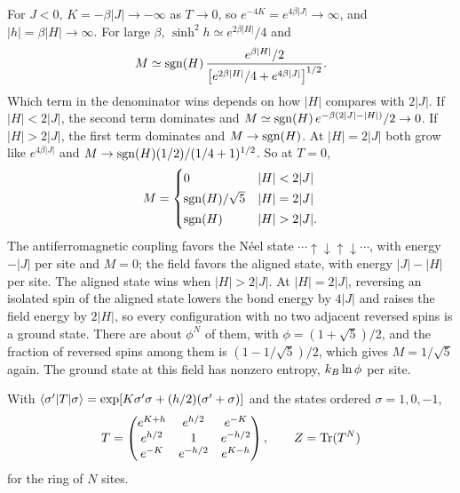 For $J<0$, $K = -\beta|J|\to-\infty$ as $T\to 0$, so $e^{-4K} = e^{4\beta|J|}\to\infty$, and $|h| = \beta|H|\to\infty$.
For large $\beta$, $\sinh^2h\simeq e^{2\beta|H|}/4$ and
\begin{equation}
  M\simeq\operatorname{sgn}(H)\,\frac{e^{\beta|H|}/2}{\left[e^{2\beta|H|}/4+e^{4\beta|J|}\right]^{1/2}}.
\end{equation}
Which term in the denominator wins depends on how $|H|$ compares with $2|J|$. If $|H|<2|J|$, the second term
dominates and $M\simeq\operatorname{sgn}(H)\,e^{-\beta(2|J|-|H|)}/2\to 0$. If $|H|>2|J|$, the first term dominates and
$M\to\operatorname{sgn}(H)$. At $|H| = 2|J|$ both grow like $e^{4\beta|J|}$ and $M\to\operatorname{sgn}(H)(1/2)/(1/4+1)^{1/2}$. So at $T = 0$,
\begin{equation}
  M = \begin{cases} 0 & |H|<2|J|\\[2pt] \sgn(H)/\sqrt5 & |H| = 2|J|\\[2pt] \sgn(H) & |H|>2|J| .\end{cases}
\end{equation}
The antiferromagnetic coupling favors the N\'eel state $\cdots\uparrow\downarrow\uparrow\downarrow\cdots$, with energy
$-|J|$ per site and $M = 0$; the field favors the aligned state, with energy $|J|-|H|$ per site. The aligned state wins
when $|H|>2|J|$. At $|H| = 2|J|$, reversing an isolated spin of the aligned state lowers the bond energy by $4|J|$ and
raises the field energy by $2|H|$, so every configuration with no two adjacent reversed spins is a ground state. There
are about $\phi^N$ of them, with $\phi = (1+\sqrt5)/2$, and the fraction of reversed spins among them is
$(1-1/\sqrt5)/2$, which gives $M = 1/\sqrt5$ again. The ground state at this field has nonzero entropy, $k_{B}\ln\phi$
per site.

 With $\langle \sigma'|T|\sigma\rangle = \exp[K\sigma'\sigma+(h/2)(\sigma'+\sigma)]$ and the states ordered
$\sigma = 1,0,-1$,
\begin{equation}
  T = \begin{pmatrix} e^{K+h} & e^{h/2} & e^{-K}\\ e^{h/2} & 1 & e^{-h/2}\\ e^{-K} & e^{-h/2} & e^{K-h}\end{pmatrix},
  \qquad Z = \operatorname{Tr}(T^N)
\end{equation}
for the ring of $N$ sites.

